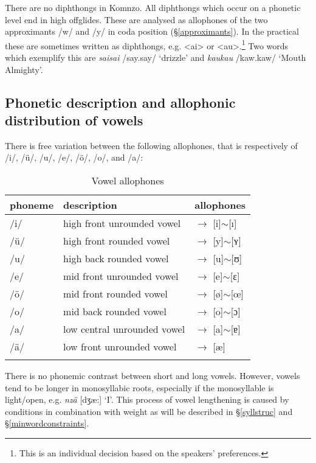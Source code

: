 There are no diphthongs in Komnzo. All diphthongs which occur on a phonetic level end in high offglides. These are analysed as allophones of the two approximants /w/ and /y/ in coda position (\S{}\ref{approximants}). In the practical  these are sometimes written as diphthongs, e.g. <ai> or <au>.\footnote{This is an individual decision based on the speakers' preferences.} Two words which exemplify this are \emph{saisai} /say.say/ `drizzle' and \emph{kaukau} /kaw.kaw/ `Mouth Almighty'.

\subsection{Phonetic description and allophonic distribution of vowels} \label{phonetic-description-vowels}

There is free variation between the following allophones, that is respectively of /i/, /ü/, /u/, /e/, /ö/, /o/, and /a/:

\begin{table}
\caption{Vowel allophones}
\label{allovowel}
	\begin{tabularx}{\textwidth}{Xll}
		\lsptoprule
		phoneme&description&allophones\\\midrule
		/i/ &high front unrounded vowel &$\rightarrow$ [i]$\sim$[ı]\\
		/ü/ &high front rounded vowel &$\rightarrow$ [y]$\sim$[ʏ]\\
		/u/ &high back rounded vowel &$\rightarrow$ [u]$\sim$[ʊ]\\
		/e/ &mid front unrounded vowel &$\rightarrow$ [e]$\sim$[ɛ]\\
		/ö/ &mid front rounded vowel &$\rightarrow$ [ø]$\sim$[œ]\\
		/o/ &mid back rounded vowel &$\rightarrow$ [o]$\sim$[ɔ]\\
		/a/ &low central unrounded vowel &$\rightarrow$ [a]$\sim$[ɐ]\\
		/ä/ &low front unrounded vowel &$\rightarrow$ [æ]\\
		\lspbottomrule
	\end{tabularx}
\end{table}%

There is no phonemic contrast between short and long vowels. However, vowels tend to be longer in monosyllabic roots, especially if the monosyllable is light/open, e.g. \emph{nzä} [dʒæ:] `I'. This process of vowel lengthening is caused by  conditions in combination with  weight as will be described in \S{}\ref{syllstruc} and \S{}\ref{minwordconstraints}.

